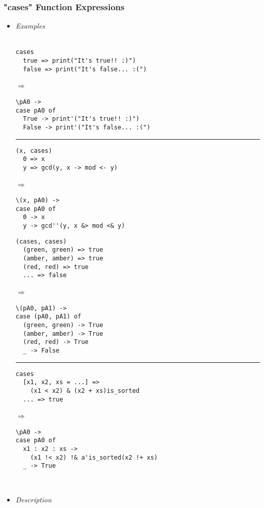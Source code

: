 \documentclass{article}
\def\lra{$\Longrightarrow$\ }
\begin{document}
\newpage
\subsubsection{"cases" Function Expressions}
\begin{itemize}
\item
\textit{Examples}\\\\
\begin{minipage}[t][12cm][t]{\linewidth}
\begin{minipage}{0.42\linewidth}

\begin{verbatim}
cases
  true => print("It's true!! :)")
  false => print("It's false... :(")
\end{verbatim}
\lra
\begin{verbatim}
\pA0 ->
case pA0 of
  True -> print'("It's true!! :)")
  False -> print'("It's false... :(")
\end{verbatim}

\rule{\linewidth}{0.1pt}

\begin{verbatim}
(x, cases)
  0 => x
  y => gcd(y, x -> mod <- y)
\end{verbatim}
\lra
\begin{verbatim}
\(x, pA0) ->
case pA0 of
  0 -> x
  y -> gcd''(y, x &> mod <& y)
\end{verbatim}
\end{minipage}
\hfill\vline\hfill
\begin{minipage}{0.45\linewidth}
\begin{verbatim}
(cases, cases)
  (green, green) => true
  (amber, amber) => true
  (red, red) => true
  ... => false
\end{verbatim}
\lra
\begin{verbatim}
\(pA0, pA1) ->
case (pA0, pA1) of
  (green, green) -> True
  (amber, amber) -> True
  (red, red) -> True
  _ -> False
\end{verbatim}

\rule{\linewidth}{0.1pt}

\begin{verbatim}
cases
  [x1, x2, xs = ...] =>
    (x1 < x2) & (x2 + xs)is_sorted
  ... => true
\end{verbatim}
\lra
\begin{verbatim}
\pA0 ->
case pA0 of
  x1 : x2 : xs ->
    (x1 !< x2) !& a'is_sorted(x2 !+ xs)
  _ -> True
\end{verbatim}
\end{minipage}
\end{minipage}
\\
\item
\textit{Description}\\


\end{itemize}
\end{document}
